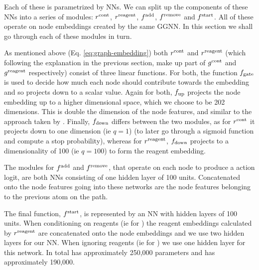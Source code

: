 Each of these is parametrized by NNs. We can split up the components of these NNs into a series of modules: $r^{\textrm{cont}}$, $r^{\textrm{reagent}}$, $f^{\textrm{add}}$, $f^{\textrm{remove}}$ and $f^{\textrm{start}}$. 
All of these operate on node embeddings created by the same GGNN.
 In this section we shall go through each of these modules in turn.




As mentioned above (Eq. \ref{eq:graph-embedding}) both $r^{\textrm{cont}}$ and $r^{\textrm{reagent}}$ (which following the explanation in the previous section, make up part of $g^{\textrm{cont}}$ and $g^{\textrm{reagent}}$ respectively) consist of three
linear functions. 
For  both, the function $f_\textrm{gate}$ is used to decide how much each node should contribute towards the embedding and so projects down to a scalar value.
Again for both, $f_\textrm{up}$ projects the node embedding up to a higher dimensional space, which we choose to be 202 dimensions. 
This is double the dimension of the node features, and similar to the approach taken by \citet[\S B.1]{li2018learning}.
Finally, $f_\textrm{down}$ differs between the two modules, as for $r^{\textrm{cont}}$ it projects down to one dimension (ie $q=1$) (to later go through a sigmoid function and compute a stop probability), whereas for  $r^{\textrm{reagent}}$, $f_\textrm{down}$ projects  to a dimensionality of 100 (ie $q=100$) to form the reagent embedding.


The modules for $f^{\textrm{add}}$ and $f^{\textrm{remove}}$, that operate on each node to produce a action logit, are both NNs consisting of one hidden layer of 100 units. 
Concatenated onto the node features going into these networks are the node features belonging to the previous atom on the path.



The final function, $f^{\textrm{start}}$, is represented by an NN with hidden layers of 100 units. 
When conditioning on reagents (ie for
 \ourModelR
 )
  the reagent embeddings calculated by $r^{\textrm{reagent}}$ are concatenated onto the node embeddings and we use two hidden layers for our NN. When ignoring reagents (ie for \ourModelIR) we use one hidden layer for this network. In total \ourModelR has approximately 250,000 parameters and \ourModelIR has approximately 190,000.


